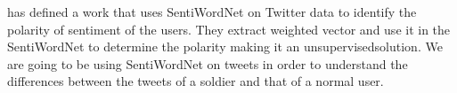 \cite{montejo2012random} has defined a work that uses SentiWordNet on Twitter data to identify the polarity of sentiment of the users. They extract weighted vector and use it in the SentiWordNet to determine the polarity making it an unsupervisedsolution. We are going to be using SentiWordNet on tweets in order to understand the differences between the tweets of a soldier and that of a normal user.
